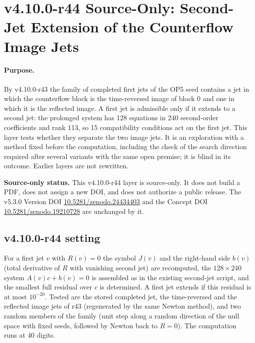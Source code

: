 \clearpage
\section*{v4.10.0-r44 Source-Only: Second-Jet Extension of the Counterflow Image Jets}
\label{sec:v4100-r44-second-jet}

\paragraph{Purpose.}
By v4.10.0-r43 the family of completed first jets of the OP5 seed contains a jet in which the counterflow block is the time-reversed image of
block 0 and one in which it is the reflected image.  A first jet is admissible only if it extends to a second jet: the prolonged system has 128
equations in 240 second-order coefficients and rank 113, so 15 compatibility conditions act on the first jet.  This layer tests whether they
separate the two image jets.  It is an exploration with a method fixed before the computation, including the check of the search direction
required after several variants with the same open premise; it is blind in its outcome.  Earlier layers are not rewritten.

\noindent\textbf{Source-only status.}
This v4.10.0-r44 layer is source-only.  It does not build a PDF, does not assign a new DOI,
and does not authorize a public release.  The v5.3.0 Version DOI
\href{https://doi.org/10.5281/zenodo.24434403}{10.5281/zenodo.24434403} and the Concept DOI
\href{https://doi.org/10.5281/zenodo.19210728}{10.5281/zenodo.19210728} are unchanged by it.

\subsection*{v4.10.0-r44 setting}
\label{subsec:v4100-r44-setting}

For a first jet \(v\) with \(R(v)=0\) the symbol \(J(v)\) and the right-hand side \(b(v)\) (total derivative of \(R\) with vanishing second jet) are
recomputed, the \(128\times240\) system \(A(v)c+b(v)=0\) is assembled as in the existing second-jet script, and the smallest full residual over
\(c\) is determined.  A first jet extends if this residual is at most \(10^{-20}\).  Tested are the stored completed jet, the time-reversed and the
reflected image jets of r43 (regenerated by the same Newton method), and two random members of the family (unit step along a random direction
of the null space with fixed seeds, followed by Newton back to \(R=0\)).  The computation runs at 40 digits.

